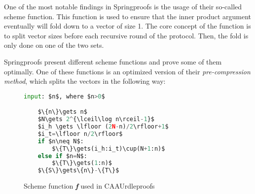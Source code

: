 One of the most notable findings in Springproofs is the usage of their so-called scheme function.
This function is used to ensure that the inner product argument eventually will fold down to a vector of size 1.
The core concept of the function is to split vector sizes before each recursive round of the protocol.
Then, the fold is only done on one of the two sets.

Springproofs present different scheme functions and prove some of them optimally.
One of these functions is an optimized version of their \textit{pre-compression method}, which splits the vectors in the following way:

\begin{figure}[ht]\label{fig:schemefunc}
\begin{framed}
    \begin{lstlisting}[language=Python,mathescape=true,label={lst:schemefunc}]
    input: $n$, where $n>0$

    $\{n\}\gets n$
    $N\gets 2^{\lceil\log n\rceil-1}$
    $i_h \gets \lfloor (2N-n)/2\rfloor+1$
    $i_t=\lfloor n/2\rfloor$
    if $n\neq N$:
        $\{T\}\gets(i_h:i_t)\cup(N+1:n)$
    else if $n=N$:
        $\{T\}\gets(1:n)$
    $\{S\}\gets\{n\}-\{T\}$
    \end{lstlisting}
\end{framed}
\caption{Scheme function \textbf{\textit{f}} used in CAAUrdleproofs}
\end{figure}

